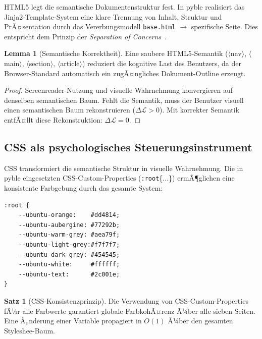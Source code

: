﻿\documentclass[a4paper,12pt]{article}
\theoremstyle{definition}
\newtheorem{satz}{Satz}
\newtheorem{lemma}{Lemma}
\begin{document}
HTML5 legt die semantische Dokumentenstruktur fest. In pyble realisiert
das Jinja2-Template-System eine klare Trennung von Inhalt, Struktur und
PrÃ¤sentation durch das Vererbungsmodell \texttt{base.html} $\to$ spezifische
Seite. Dies entspricht dem Prinzip der \emph{Separation of Concerns}~\cite{dijkstra1982}.

\begin{lemma}[Semantische Korrektheit]
\label{lem:html}
    Eine saubere HTML5-Semantik ($\langle$nav$\rangle$, $\langle$main$\rangle$,
    $\langle$section$\rangle$, $\langle$article$\rangle$) reduziert die
    kognitive Last des Benutzers, da der Browser-Standard automatisch
    ein zugÃ¤ngliches Dokument-Outline erzeugt.
\end{lemma}

\begin{proof}
    Screenreader-Nutzung und visuelle Wahrnehmung konvergieren auf
    denselben semantischen Baum. Fehlt die Semantik, muss der Benutzer
    visuell einen semantischen Baum rekonstruieren ($\Delta\mathcal{L} > 0$).
    Mit korrekter Semantik entfÃ¤llt diese Rekonstruktion: $\Delta\mathcal{L} = 0$.
\end{proof}

\subsection{CSS als psychologisches Steuerungsinstrument}

CSS transformiert die semantische Struktur in visuelle Wahrnehmung.
Die in pyble eingesetzten CSS-Custom-Properties (\texttt{:root}\{...\})
ermÃ¶glichen eine konsistente Farbgebung durch das gesamte System:

\begin{lstlisting}[caption={CSS Custom Properties in pyble (base.css)}]
:root {
    --ubuntu-orange:    #dd4814;
    --ubuntu-aubergine: #77292b;
    --ubuntu-warm-grey: #aea79f;
    --ubuntu-light-grey:#f7f7f7;
    --ubuntu-dark-grey: #454545;
    --ubuntu-white:     #ffffff;
    --ubuntu-text:      #2c001e;
}
\end{lstlisting}

\begin{satz}[CSS-Konsistenzprinzip]
\label{satz:css}
    Die Verwendung von CSS-Custom-Properties fÃ¼r alle Farbwerte garantiert
    globale FarbkohÃ¤renz Ã¼ber alle sieben Seiten. Eine Ã„nderung einer Variable
    propagiert in $O(1)$ Ã¼ber den gesamten Styleshee-Baum.
\end{satz}
\end{document}
